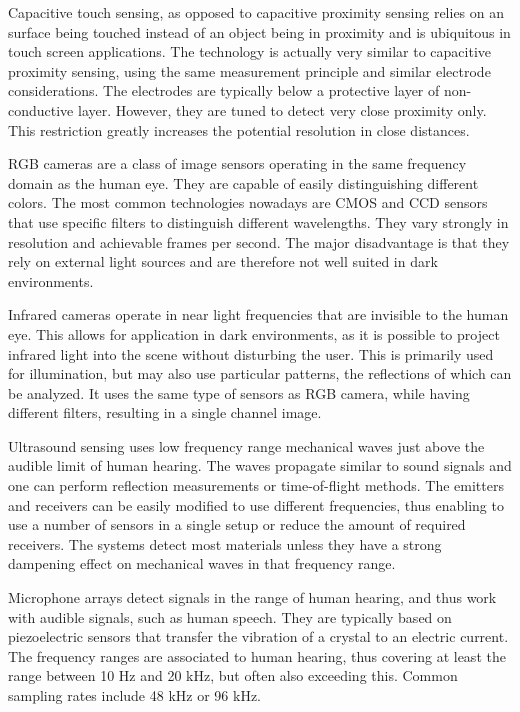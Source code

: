 Capacitive touch sensing, as opposed to capacitive proximity sensing relies on an surface being touched instead of an object being in proximity and is ubiquitous in touch screen applications. The technology is actually very similar to capacitive proximity sensing, using the same measurement principle and similar electrode considerations. The electrodes are typically below a protective layer of non-conductive layer. However, they are tuned to detect very close proximity only. This restriction greatly increases the potential resolution in close distances.

RGB cameras are a class of image sensors operating in the same frequency domain as the human eye. They are capable of easily distinguishing different colors. The most common technologies nowadays are CMOS and CCD sensors that use specific filters to distinguish different wavelengths. They vary strongly in resolution and achievable frames per second. The major disadvantage is that they rely on external light sources and are therefore not well suited in dark environments.

Infrared cameras operate in near light frequencies that are invisible to the human eye. This allows for application in dark environments, as it is possible to project infrared light into the scene without disturbing the user. This is primarily used for illumination, but may also use particular patterns, the reflections of which can be analyzed. It uses the same type of sensors as RGB camera, while having different filters, resulting in a single channel image.

Ultrasound sensing uses low frequency range mechanical waves just above the audible limit of human hearing. The waves propagate similar to sound signals and one can perform reflection measurements or time-of-flight methods. The emitters and receivers can be easily modified to use different frequencies, thus enabling to use a number of sensors in a single setup or reduce the amount of required receivers. The systems detect most materials unless they have a strong dampening effect on mechanical waves in that frequency range.

Microphone arrays detect signals in the range of human hearing, and thus work with audible signals, such as human speech. They are typically based on piezoelectric sensors that transfer the vibration of a crystal to an electric current. The frequency ranges are associated to human hearing, thus covering at least the range between 10 Hz and 20 kHz, but often also exceeding this. Common sampling rates include 48 kHz or 96 kHz. 

